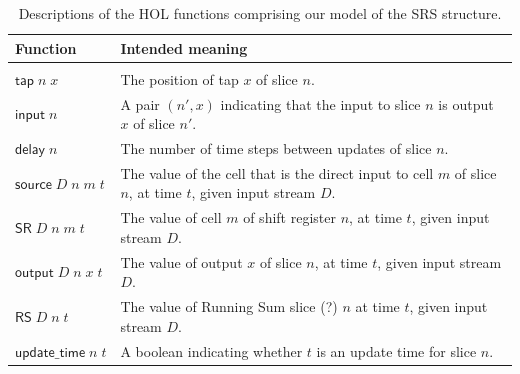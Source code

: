 \documentclass{llncs}
\begin{document}




\begin{table}[t]
\caption{
Descriptions of the HOL functions comprising our model of the SRS structure.
\label{tab:descriptions}
}
\begin{tabular}{lp{}}
Function&Intended meaning\\
\hline\\
\(\mathsf{tap}\;n\;x\)&The position of tap $x$ of slice $n$.\\
\(\mathsf{input}\;n\)&A pair $(n',x)$ indicating that the input to slice $n$ is output $x$ of slice $n'$.\\
\(\mathsf{delay}\;n\)&The number of time steps between updates of slice $n$.\\
\(\mathsf{source}\;D\;n\;m\;t\)&The value of the cell that is the direct input to cell $m$ of slice $n$, at time $t$, given input stream $D$.\\
\(\mathsf{SR}\;D\;n\;m\;t\)&The value of cell $m$ of shift register $n$, at time $t$, given input stream $D$.\\
\(\mathsf{output}\;D\;n\;x\;t\)&The value of output $x$ of slice $n$, at time $t$, given input stream $D$.\\
\(\mathsf{RS}\;D\;n\;t\)&The value of Running Sum slice (?) $n$ at time $t$, given input stream $D$.\\
\(\mathsf{update\_time}\;n\;t\)&A boolean indicating whether $t$ is an update time for slice $n$.
\end{tabular}
\end{table}
\end{document}
